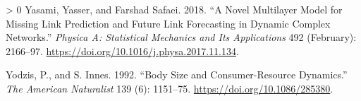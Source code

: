 \documentclass[11pt]{article}
\newlength{\cslhangindent}
\newenvironment{CSLReferences}[3] %
 {%
  \setlength{\parindent}{0pt}
  \ifodd #1 \everypar{\setlength{\hangindent}{\cslhangindent}}\ignorespaces\fi
  \ifnum #2 > 0
  \setlength{\parskip}{#2\baselineskip}
  \fi
 }%
 {}
\begin{document}
\begin{CSLReferences}{1}{0}
\leavevmode\hypertarget{ref-Yasami2018NovMul}{}%
Yasami, Yasser, and Farshad Safaei. 2018. {``A Novel Multilayer Model
for Missing Link Prediction and Future Link Forecasting in Dynamic
Complex Networks.''} \emph{Physica A: Statistical Mechanics and Its
Applications} 492 (February): 2166--97.
\url{https://doi.org/10.1016/j.physa.2017.11.134}.

\leavevmode\hypertarget{ref-Yodzis1992BodSiz}{}%
Yodzis, P., and S. Innes. 1992. {``Body Size and Consumer-Resource
Dynamics.''} \emph{The American Naturalist} 139 (6): 1151--75.
\url{https://doi.org/10.1086/285380}.

\end{CSLReferences}
\end{document}
